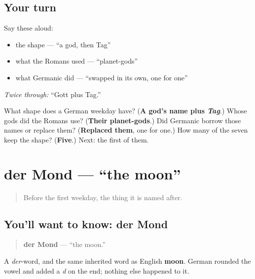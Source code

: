 \subsection*{Your turn}
Say these aloud:

\begin{itemize}
\raggedright
  \item the shape — \textquotedblleft{}a god, then Tag\textquotedblright{}
  \item what the Romans used — \textquotedblleft{}planet-gods\textquotedblright{}
  \item what Germanic did — \textquotedblleft{}swapped in its own, one for one\textquotedblright{}
\end{itemize}

\emph{Twice through:} \textquotedblleft{}Gott plus Tag.\textquotedblright{}

\begin{tcolorbox}[breakable,colback=teal!4,colframe=teal!35!black,title={Before you move on}]
What shape does a German weekday have? (\textbf{A god's name plus \emph{Tag}}.) Whose gods did the Romans use? (\textbf{Their planet-gods}.) Did Germanic borrow those names or replace them? (\textbf{Replaced them}, one for one.) How many of the seven keep the shape? (\textbf{Five}.) Next: the first of them.
\end{tcolorbox}
\section[der Mond]{der Mond — \textquotedblleft{}the moon\textquotedblright{}}

\label{lesson:GE-C07-mond}



\begin{quote}
Before the first weekday, the thing it is named after.
\end{quote}

\subsection*{You'll want to know: der Mond}
\begin{quote}
\textbf{der Mond} — \textquotedblleft{}the moon.\textquotedblright{}
\end{quote}

A \emph{der}-word, and the same inherited word as English \textbf{moon}. German rounded the vowel and added a \emph{d} on the end; nothing else happened to it.

